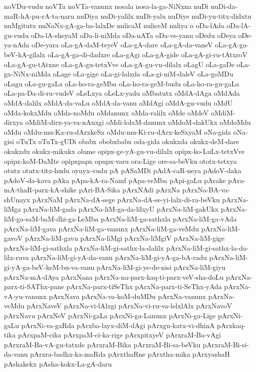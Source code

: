 {noVDu-vudu
noVTa
noVTa-vanunx
nosala
nosa-la-ga-NiNxna
nuDi
nuDi-da-maR-hA-pu-rA-ta-naru
nuDiya
nuDi-yalilx
nuDi-yalu
nuDiye
nuDi-yu-titx-didxtu
nuMgitutx
nuNaNx-gA-ga-ba-lalxDe
nulicaM
nuliceM
nuliya
o
oDa-lAda
oDa-lA-gu-vudu
oDa-lA-sheyaM
oDa-li-niMda
oDa-nATa
oDa-ve-yanu
oDedu
oDeya
oDe-ya-nAda
oDe-yara
oLa-gA-daM-teyeV
oLa-gA-dare
oLa-gA-da-vaneV
oLa-gA-ga-beV-kA-gilalx
oLa-gA-ga-di-dadxre
oLa-gAgi
oLa-gA-gide
oLa-gA-gi-ru-tAtxroV
oLa-gA-gu-tAtxne
oLa-gA-gu-tetxVve
oLa-gA-gu-vu-dilalx
oLagU
oLa-gaDe
oLa-ga-NiNx-niMda
oLage
oLa-gige
oLa-gi-lalxda
oLa-gi-niM-daleV
oLa-goMDu
oLagu
oLa-gu-gaLa
oLa-ho-ra-geMba
oLa-ho-ra-geM-budu
oLa-ho-ra-gu-gaLa
oLa-pa-Da-di-ru-vudeV
oLeLxya
oLeLx-yadu
oMbatutx
oMdA-dAga
oMdAda
oMdA-dalilx
oMdA-da-vaLu
oMdA-da-vanu
oMdAgi
oMdA-gu-vudu
oMdU
oMda-kokxMdu
oMda-noMdu
oMdanunx
oMda-ralilx
oMde
oMdeV
oMdiM-dirxya
oMdiM-dirx-ya-va-nAnxgi
oMdi-lolxM-danunx
oMdoM-dakUkx
oMdoMdu
oMdu
oMdu-mu-Ka-ru-dArxkeSx
oMdu-mu-Ki-ru-dArx-keSxyaM
oNa-gida
oNa-gisi
oTuTx
oTuTx-gUDi
obabx
obobxbabx
oda-gida
okukxda
okukx-deM-dare
okukxdu
okukx-mikukx
olume
opipx-ge-yA-gu-vu-dilalx
opipx-ko-LuLx-tetxVve
opipx-koM-DaMte
opipxpapx
opupx-varu
ora-Lige
ore-sa-beVku
ototx-tetxya
otutx
otutx-titx-hudu
oyuyx-vudu
pA
pASaMDi
pAdA-caR-neya
pAdoV-daka
pAdoV-da-kava
pAka
pApa-kA-ra-Namf
pApa-veMba
pApi-gaLu
pArake
pAra-mA-thaR-parx-kA-shike
pAri-BA-Sika
pArxNAdi
pArxNa
pArxNa-BA-va-shUnayx
pArxNaM
pArxNa-dA-sege
pArxNa-dA-se-yi-lalx-di-ra-beVku
pArxNa-liMga
pArxNa-liM-gada
pArxNa-liM-ga-da-lilxyU
pArxNa-liM-gakUkx
pArxNa-liM-ga-saM-baM-dhi-ga-LeMba
pArxNa-liM-ga-sathxla
pArxNa-liM-ga-vAda
pArxNa-liM-gava
pArxNa-liM-ga-vanunx
pArxNa-liM-ga-veMdu
pArxNa-liM-gavoV
pArxNa-liM-gavu
pArxNa-liMgi
pArxNa-liMgiV
pArxNa-liM-gige
pArxNa-liM-gi-sathxla
pArxNa-liM-gi-sathx-la-dalilx
pArxNa-liM-gi-sathx-la-da-lilx-ruva
pArxNa-liM-gi-yA-da-vanu
pArxNa-liM-gi-yA-ga-bA-radu
pArxNa-liM-gi-yA-ga-beV-keM-bu-va-vanu
pArxNa-liM-gi-ye-de-nisi
pArxNa-liM-giyu
pArxNa-mA-dAya
pArxNana
pArxNa-na-parx-kaq-ti-parx-veV-sha-doLu
pArxNa-parx-ti-SAThx-pane
pArxNa-parx-tiSeThx
pArxNa-parx-ti-SeThx-yAda
pArxNa-vA-yu-vanunx
pArxNava
pArxNa-va-koM-duMDu
pArxNa-vanunx
pArxNa-veMdu
pArxNaveV
pArxNa-vi-lAlxgi
pArxNa-vi-ru-va-lelxlAlx
pArxNavoV
pArxNavu
pArxNeV
pArxNi-gaLa
pArxNi-ga-Lanunx
pArxNi-ga-Lige
pArxNi-gaLu
pArxNi-va-gaRda
pArxba-layx-diM-dAgi
pArxgu-katx-vi-dhinA
pArxkaq-tika
pArxpaM-cika
pArxpaM-ci-ka-rige
pArxpitxyeV
pArxraM-Ba-vAgi
pArxraM-Ba-vA-gu-tatxde
pArxraM-Bika
pArxraM-Bi-sa-beVku
pArxraM-Bi-si-da-vanu
pArxra-badhx-ka-maRda
pArxthaRne
pArxtha-mika
pArxyashaH
pAshakekx
pAsha-kokx-La-gA-daru
}
